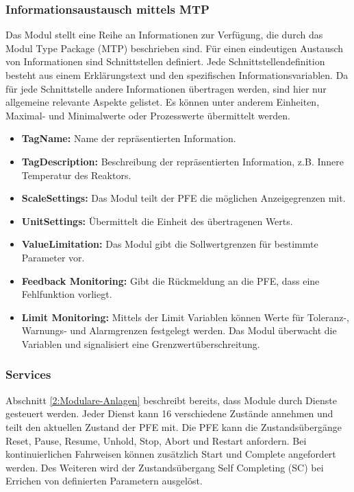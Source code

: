 \subsubsection*{Informationsaustausch mittels MTP}
Das Modul stellt eine Reihe an Informationen zur Verfügung, die durch das Modul Type Package (MTP) beschrieben sind. Für einen eindeutigen Austausch von Informationen sind Schnittstellen definiert. Jede Schnittstellendefinition besteht aus einem Erklärungstext und den spezifischen Informationsvariablen. Da für jede Schnittstelle andere Informationen übertragen werden, sind hier nur allgemeine relevante Aspekte gelistet. Es können unter anderem Einheiten, Maximal- und Minimalwerte oder Prozesswerte übermittelt werden. \cite{VDI2658-Blatt3} 
\begin{itemize}
\item \textbf{TagName:} Name der repräsentierten Information. 
\item \textbf{TagDescription:} Beschreibung der repräsentierten Information, z.B. Innere Temperatur des Reaktors.
\item \textbf{ScaleSettings:} Das Modul teilt der PFE die möglichen Anzeigegrenzen mit.
\item \textbf{UnitSettings:} Übermittelt die Einheit des übertragenen Werts.
\item \textbf{ValueLimitation:} Das Modul gibt die Sollwertgrenzen für bestimmte Parameter vor.
\item \textbf{Feedback Monitoring:} Gibt die Rückmeldung an die PFE, dass eine Fehlfunktion vorliegt.
\item \textbf{Limit Monitoring:} Mittels der Limit Variablen können Werte für Toleranz-, Warnungs- und Alarmgrenzen festgelegt werden. Das Modul überwacht die Variablen und signalisiert eine Grenzwertüberschreitung.
\end{itemize}

\subsubsection*{Services}
Abschnitt \ref{2:Modulare-Anlagen} beschreibt bereits, dass Module durch Dienste gesteuert werden. Jeder Dienst kann 16 verschiedene Zustände annehmen und teilt den aktuellen Zustand der PFE mit. Die PFE kann die Zustandsübergänge Reset, Pause, Resume, Unhold, Stop, Abort und Restart anfordern. Bei kontinuierlichen Fahrweisen können zusätzlich Start und Complete angefordert werden. Des Weiteren wird der Zustandsübergang Self Completing (SC) bei Errichen von definierten Parametern ausgelöst. \cite{Bloch2017}

